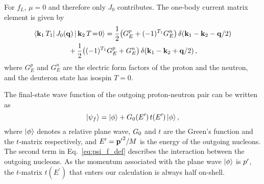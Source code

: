 	For $f_L$, $\mu = 0$ and therefore only $J_0$ contributes.
	The one-body current matrix element is given by
	\begin{multline}
	 \la \mbf{k}_1 \, T_1| \, J_0(\mbf{q}) \, | \,\mbf{k}_2 \, T\!=\!0 \ra
	 = \frac{1}{2} \big(G_E^p + (-1)^{T_1} G_E^n\big) \,
	 \delta(\mbf{k}_1 - \mbf{k}_2 - \mbf{q}/2) \\
	 \null + \frac{1}{2} \big((-1)^{T_1} G_E^p +  G_E^n\big) \, \delta(\mbf{k}_1
	 - \mbf{k}_2 + \mbf{q}/2) \,,
	\label{eq:J0_def}
	\end{multline}
	where $G_E^p$ and $G_E^n$ are the electric form factors of the proton and the
	neutron, and the deuteron state has isospin $T=0$.

	The final-state wave function of the outgoing proton-neutron pair can be
	written	as
	\begin{equation}
	 |\psi_f\rangle = | \phi \rangle + G_0 (E^\prime) \, t(E^\prime) \,| \phi \rangle \,,
	\label{eq:psi_f_def}
	\end{equation}
	where ${|\phi\rangle}$ denotes a relative plane wave, $G_0$ and $t$
	are the Green's function and the $t$-matrix respectively, and  $E^\prime =
	\mathbf{p^\prime}^2/M$ is the energy of the outgoing nucleons.  The second term in
	Eq.~\eqref{eq:psi_f_def} describes the interaction between the outgoing
	nucleons.  As the momentum associated with the plane wave ${|\phi\rangle}$ is
	$p^\prime$, the $t$-matrix $t(E^\prime)$ that enters our calculation is always
	half on-shell.

